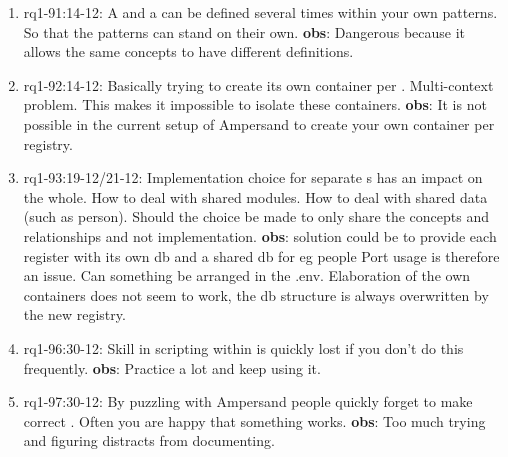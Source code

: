 \begin{enumerate}
    \item rq1-91:14-12: A  and a  can be defined several times within your own patterns.
    So that the patterns can stand on their own.
    \newline\textbf{obs}: Dangerous because it allows the same concepts to have different definitions.
    
    \item rq1-92:14-12: Basically trying to create its own container per .
    Multi-context problem.
    This makes it impossible to isolate these containers.
    \newline\textbf{obs}: It is not possible in the current setup of Ampersand to create your own container per registry.
    
    \item rq1-93:19-12/21-12: Implementation choice for separate s has an impact on the whole.
    How to deal with shared modules.
    How to deal with shared data (such as person).
    Should the choice be made to only share the concepts and relationships and not implementation.
    \newline\textbf{obs}: solution could be to provide each register with its own db and a shared db for eg people
    Port usage is therefore an issue.
    Can something be arranged in the .env.
    Elaboration of the own containers does not seem to work, the db structure is always overwritten by the new registry.
    
    
    \item rq1-96:30-12: Skill in scripting within  is quickly lost if you don't do this frequently.
    \newline\textbf{obs}: Practice a lot and keep using it.
    
    \item rq1-97:30-12: By puzzling with Ampersand people quickly forget to make correct .
    Often you are happy that something works.
    \newline\textbf{obs}: Too much trying and figuring distracts from documenting.
    
\end{enumerate}
    
    \newpage
